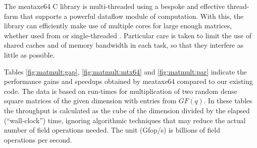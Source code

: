 The meataxe64 C library is multi-threaded using a bespoke and
effective thread-farm that supports a powerful dataflow module of
computation. With this, the library can efficiently make
use of multiple cores for large enough matrices, whether used from
\HPCGAP or single-threaded \GAP. Particular care is taken to limit the use of
shared caches and of memory bandwidth in each task, so that they
interfere as little as possible. 

Tables \ref{fig:matmult:gap}, \ref{fig:matmult:mtx64} and
\ref{fig:matmult:par} indicate the performance gains and
speedups obtained by meataxe64 compared to our existing code.  The
data is based on run-times for multiplication of two random dense
square matrices of the given dimension with entries from $GF(q)$. In
these tables the throughput is calculated as the cube of the dimension
divided by the elapsed (``wall-clock'') time, ignoring algorithmic
techniques that may reduce the actual number of field operations
needed. The unit (Gfop/s) is billions of field operations per
second. 


